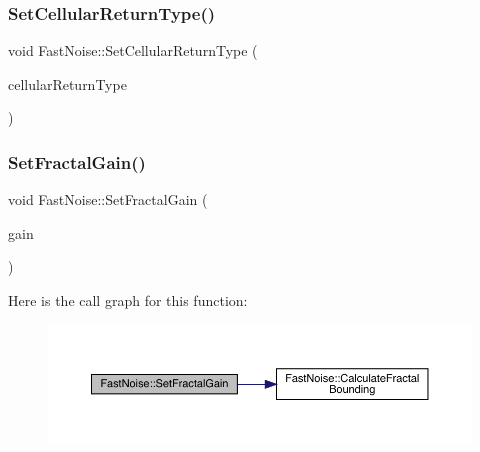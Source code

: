 \mbox{\label{class_fast_noise_ac643a011759d70ed71651774f53f1c65}} 
\subsubsection{\texorpdfstring{Set\+Cellular\+Return\+Type()}{SetCellularReturnType()}}
{\footnotesize\ttfamily void Fast\+Noise\+::\+Set\+Cellular\+Return\+Type (\begin{DoxyParamCaption}\item[{\mbox{\hyperlink{class_fast_noise_a942d73b97b870138c9a07249d5a57737}{Cellular\+Return\+Type}}}]{cellular\+Return\+Type }\end{DoxyParamCaption})\hspace{0.3cm}{\ttfamily [inline]}}

\mbox{\label{class_fast_noise_abbd1dd9839957f18f5eaf8b2b61610ac}} 
\subsubsection{\texorpdfstring{Set\+Fractal\+Gain()}{SetFractalGain()}}
{\footnotesize\ttfamily void Fast\+Noise\+::\+Set\+Fractal\+Gain (\begin{DoxyParamCaption}\item[{\mbox{\hyperlink{_fast_noise_8h_a75a9ef6d2541c4921815b885bfd449c3}{F\+N\+\_\+\+D\+E\+C\+I\+M\+AL}}}]{gain }\end{DoxyParamCaption})\hspace{0.3cm}{\ttfamily [inline]}}

Here is the call graph for this function\+:
\nopagebreak
\begin{figure}[H]
\begin{center}
\leavevmode
\includegraphics[width=350pt]{d1/dd8/class_fast_noise_abbd1dd9839957f18f5eaf8b2b61610ac_cgraph}
\end{center}
\end{figure}
\mbox{\label{class_fast_noise_a2e5e8651bc949144ade310c748518fc2}} 

